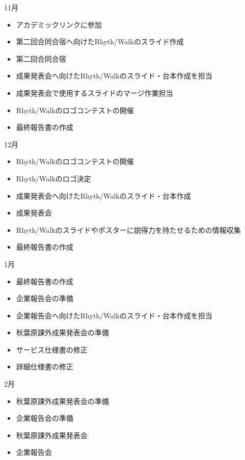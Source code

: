 11月
\begin{itemize}
\item アカデミックリンクに参加
\item 第二回合同合宿へ向けたRhyth/Walkのスライド作成
\item 第二回合同合宿
\item 成果発表会へ向けたRhyth/Walkのスライド・台本作成を担当
\item 成果発表会で使用するスライドのマージ作業担当
\item Rhyth/Walkのロゴコンテストの開催
\item 最終報告書の作成
\end{itemize}
12月
\begin{itemize}
\item Rhyth/Walkのロゴコンテストの開催
\item Rhyth/Walkのロゴ決定
\item 成果発表会へ向けたRhyth/Walkのスライド・台本作成
\item 成果発表会
\item Rhyth/Walkのスライドやポスターに説得力を持たせるための情報収集
\item 最終報告書の作成
\end{itemize}
1月
\begin{itemize}
\item 最終報告書の作成
\item 企業報告会の準備
\item 企業報告会へ向けたRhyth/Walkのスライド・台本作成を担当
\item 秋葉原課外成果発表会の準備
\item サービス仕様書の修正
\item 詳細仕様書の修正
\end{itemize}
2月
\begin{itemize}
\item 秋葉原課外成果発表会の準備
\item 企業報告会の準備
\item 秋葉原課外成果発表会
\item 企業報告会
\end{itemize}

